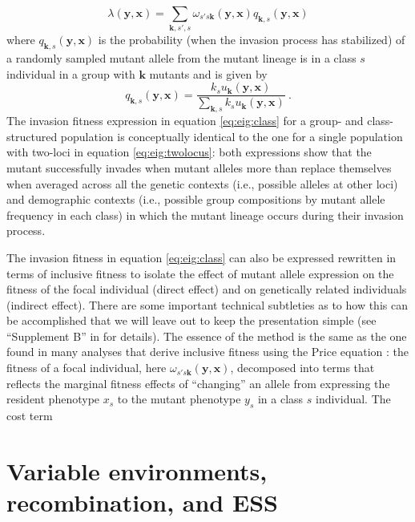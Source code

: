 \documentclass[11pt]{article}
\renewcommand{\vec}[1]{\symbf{#1}}
\newcommand{\eig}{\lambda}
\begin{document}
\begin{equation}
  \label{eq:eig:class}
  \eig(\vec{y}, \vec{x}) = \sum_{\vec{k},s',s} \omega_{s's\vec{k}}(\vec{y}, \vec{x}) q_{\vec{k},s}(\vec{y}, \vec{x})
\end{equation}
where $q_{\vec{k},s}(\vec{y}, \vec{x})$ is the probability (when the invasion process has stabilized) of a randomly sampled mutant allele from the mutant lineage is in a class $s$ individual in a group with $\vec{k}$ mutants and is given by
\begin{equation*}
  q_{\vec{k},s}(\vec{y}, \vec{x}) = \frac{k_{s} u_{\vec{k}}(\vec{y}, \vec{x})}{\sum_{\vec{k},s} k_{s} u_{\vec{k}}(\vec{y}, \vec{x})} \: .
\end{equation*}
The invasion fitness expression in equation \eqref{eq:eig:class} for a group- and class-structured population is conceptually identical to the one for a single population with two-loci in equation \eqref{eq:eig:twolocus}: both expressions show that the mutant successfully invades when mutant alleles more than replace themselves when averaged across all the genetic contexts (i.e., possible alleles at other loci) and demographic contexts (i.e., possible group compositions by mutant allele frequency in each class) in which the mutant lineage occurs during their invasion process.

The invasion fitness in equation \eqref{eq:eig:class} can also be expressed rewritten in terms of inclusive fitness to isolate the effect of mutant allele expression on the fitness of the focal individual (direct effect) and on genetically related individuals (indirect effect). There are some important technical subtleties as to how this can be accomplished that we will leave out to keep the presentation simple (see ``Supplement B'' in \cite{Lehmann:Rousset:2020} for details). The essence of the method is the same as the one found in many analyses that derive inclusive fitness using the Price equation \cite[e.g.,]{Queller:1992,Frank:1998,Lehmann:Keller:2006,Akcay:VanCleve:2012}: the fitness of a focal individual, here $\omega_{s's\vec{k}}(\vec{y}, \vec{x})$, decomposed into terms that reflects the marginal fitness effects of ``changing'' an allele from expressing the resident phenotype $x_{s}$ to the mutant phenotype $y_{s}$ in a class $s$ individual. The cost term

\section{Variable environments, recombination, and ESS}
\end{document}
